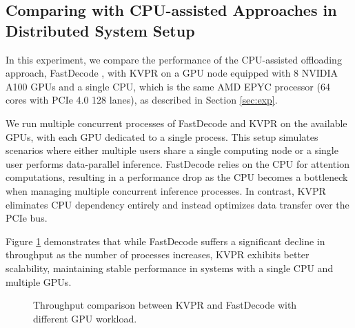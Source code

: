 \documentclass[11pt]{article}
\newcommand{\paperName}{KVPR}
\begin{document}
\subsection{Comparing with CPU-assisted Approaches in Distributed System Setup}
\label{app:comparing-cpu}

In this experiment, we compare the performance of the CPU-assisted offloading approach, FastDecode \cite{he2024fastdecode}, with {\paperName} on a GPU node equipped with 8 NVIDIA A100 GPUs and a single CPU, which is the same AMD EPYC processor (64 cores with PCIe 4.0 128 lanes), as described in Section \ref{sec:exp}.

We run multiple concurrent processes of FastDecode and {\paperName} on the available GPUs, with each GPU dedicated to a single process. This setup simulates scenarios where either multiple users share a single computing node or a single user performs data-parallel inference. FastDecode relies on the CPU for attention computations, resulting in a performance drop as the CPU becomes a bottleneck when managing multiple concurrent inference processes. In contrast, {\paperName} eliminates CPU dependency entirely and instead optimizes data transfer over the PCIe bus. 

Figure \ref{app:fig:cpu} demonstrates that while FastDecode suffers a significant decline in throughput as the number of processes increases, {\paperName} exhibits better scalability, maintaining stable performance in systems with a single CPU and multiple GPUs.

\begin{figure}[h]
\centering
{}
\caption{Throughput comparison between {\paperName} and FastDecode with different GPU workload.}
\label{app:fig:cpu}
\end{figure}
\end{document}
